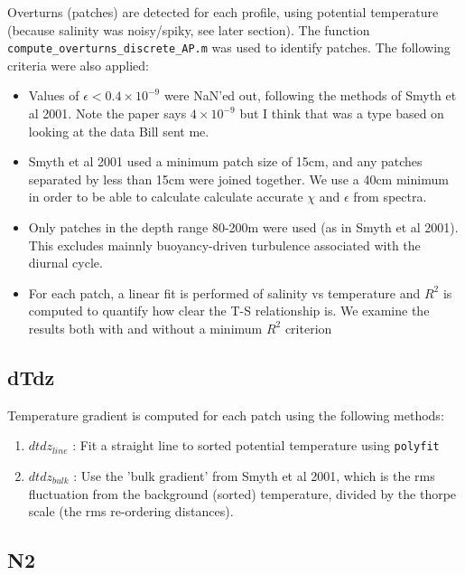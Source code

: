 \documentclass[11pt]{article}
\begin{document}
Overturns (patches) are detected for each profile, using potential temperature (because salinity was noisy/spiky, see later section). The function \verb+compute_overturns_discrete_AP.m+ was used to identify patches. \newline
The following criteria were also applied:
\begin{itemize}
\item Values of $\epsilon <0.4\times 10^{-9}$ were NaN'ed out, following the methods of Smyth et al 2001. Note the paper says $4\times 10^{-9}$ but I think that was a type based on looking at the data Bill sent me.
\item Smyth et al 2001 used a minimum patch size of 15cm, and any patches separated by less than 15cm were joined together.  We use a 40cm minimum in order to be able to calculate calculate accurate $\chi$ and $\epsilon$ from spectra.
\item Only patches in the depth range 80-200m were used (as in Smyth et al 2001). This excludes mainnly buoyancy-driven turbulence associated with the diurnal cycle.
\item For each patch, a linear fit is performed of salinity vs temperature and $R^2$ is computed to quantify how clear the T-S relationship is. We examine the results both with and without a minimum $R^2$ criterion
\end{itemize}


\subsection{dTdz}

Temperature gradient is computed for each patch using the following methods:
\begin{enumerate}
\item $dtdz_{line}$ : Fit a straight line to sorted potential temperature using \verb+polyfit+
\item $dtdz_{bulk}$ : Use the 'bulk gradient' from Smyth et al 2001, which is the rms fluctuation from the background (sorted) temperature, divided by the thorpe scale (the rms re-ordering distances).
\end{enumerate}


\subsection{N2}
\end{document}
